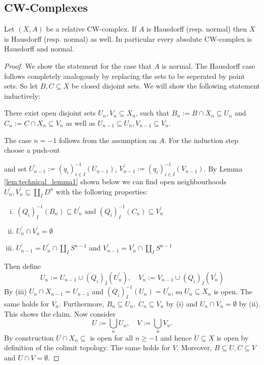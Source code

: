 \subsection{CW-Complexes}

\begin{proposition}
    Let $(X,A)$ be a relative CW-complex. If $A$ is Hausdorff (resp. normal) then $X$ is Hausdorff (resp. normal) as well. In particular every absolute CW-complex is Hausdorff and normal.
\end{proposition}
\begin{proof}
    We show the statement for the case that $A$ is normal. The Hausdorff case follows completely analogously by replacing the sets to be seperated by point sets. So let $B,C \subseteq X$ be closed disjoint sets. We will show the following statement inductively:
    \begin{claim}
    There exist open disjoint sets $U_n,V_n \subseteq X_n$, such that $B_n := B \cap X_n \subseteq U_n$ and $C_n := C \cap X_n \subseteq V_n$ as well as $U_{n-1} \subseteq U_n, V_{n-1} \subseteq V_n$.
    \end{claim}
    The case $n=-1$ follows from the assumption on $A$. For the induction step choose a push-out
    \begin{center}
    \end{center}
    and set $U_{n-1}^\prime := (q_i)^{-1}_{i \in I}(U_{n-1})$, $V_{n-1}^\prime := (q_i)^{-1}_{i \in I}(V_{n-1})$. By Lemma \ref{lem:technical_lemma1} shown below we can find open neighbourhoods $U_n^\prime,V_n^\prime \subseteq \coprod_I D^n$ with the following properties:
    \begin{enumerate}[(i)]
        \item $(Q_i)_I^{-1}(B_n) \subseteq U_n^\prime$ and $(Q_i)_I^{-1}(C_n) \subseteq V_n^\prime$
        \item $U_n^\prime \cap V_n^\prime = \emptyset$
        \item $U_{n-1}^\prime = U_n^\prime \cap \coprod_I S^{n-1}$ and $V_{n-1}^\prime = V_n^\prime \cap \coprod_I S^{n-1}$ 
    \end{enumerate}
    Then define 
    \[
    U_n := U_{n-1} \cup (Q_i)_I(U_n^\prime), \quad V_n := V_{n-1} \cup (Q_i)_I(V_n^\prime)
    \]
    By (iii) $U_n \cap X_{n-1} = U_{n-1}$ and $(Q_i)_I^{-1}(U_n) = U_n^\prime$, so $U_n \subseteq X_n$ is open. The same holds for $V_n$. Furthermore, $B_n \subseteq U_n, \; C_n \subseteq V_n$ by (i) and $U_n \cap V_n = \emptyset$ by (ii). This shows the claim. Now consider
    \[
    U := \bigcup_n U_n, \quad V := \bigcup_n V_n.
    \] 
    By construction $U \cap X_n \subseteq$ is open for all $n \geq -1$ and hence $U \subseteq X$ is open by definition of the colimit topology. The same holds for $V$. Moreover, $B \subseteq U, C \subseteq V$ and $U \cap V = \emptyset$. 
\end{proof}

